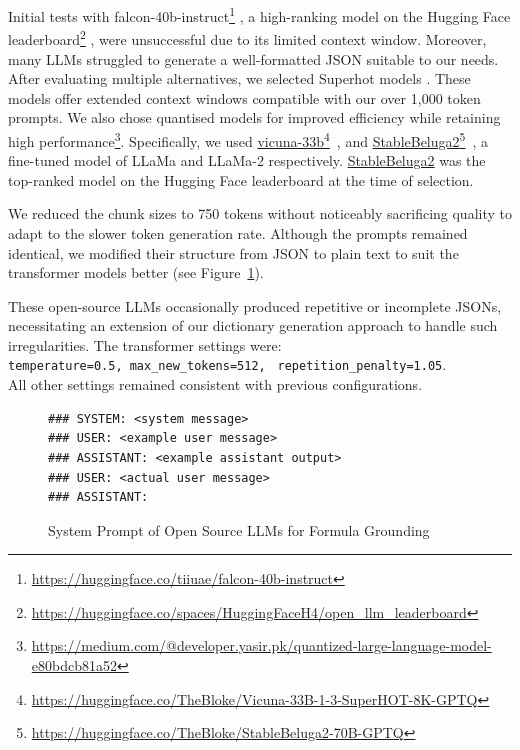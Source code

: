 Initial tests with falcon-40b-instruct\footnote{\url{https://huggingface.co/tiiuae/falcon-40b-instruct}} \citep{falcon40b, refinedweb, xu2023baize}, a high-ranking model on the Hugging Face leaderboard\footnote{\url{https://huggingface.co/spaces/HuggingFaceH4/open_llm_leaderboard}} \citep{jain2022hugging}, were unsuccessful due to its limited context window. Moreover, many LLMs struggled to generate a well-formatted JSON suitable to our needs. After evaluating multiple alternatives, we selected Superhot models \citep{chen2023extending}. These models offer extended context windows compatible with our over 1,000 token prompts. We also chose quantised models for improved efficiency while retaining high performance\footnote{\url{https://medium.com/@developer.yasir.pk/quantized-large-language-model-e80bdcb81a52}}. Specifically, we used \href{https://huggingface.co/TheBloke/Vicuna-33B-1-3-SuperHOT-8K-GPTQ}{vicuna-33b}\footnote{\url{https://huggingface.co/TheBloke/Vicuna-33B-1-3-SuperHOT-8K-GPTQ}}~\citep{zheng2023judging}, and \href{https://huggingface.co/TheBloke/StableBeluga2-70B-GPTQ}{StableBeluga2}\footnote{\url{https://huggingface.co/TheBloke/StableBeluga2-70B-GPTQ}}~\citep{StableBelugaModels, touvron2023llama, mukherjee2023orca}, a fine-tuned model of LLaMa and LLaMa-2 respectively. \href{https://huggingface.co/TheBloke/StableBeluga2-70B-GPTQ}{StableBeluga2} was the top-ranked model on the Hugging Face leaderboard at the time of selection.

We reduced the chunk sizes to 750 tokens without noticeably sacrificing quality to adapt to the slower token generation rate. Although the prompts remained identical, we modified their structure from JSON to plain text to suit the transformer models better (see Figure~\ref{fig:open-source-prompt-structure}). 

These open-source LLMs occasionally produced repetitive or incomplete JSONs, necessitating an extension of our dictionary generation approach to handle such irregularities. The transformer settings were:\\
\texttt{temperature=0.5, max\_new\_tokens=512,} \texttt{ repetition\_penalty=1.05}.\\
All other settings remained consistent with previous configurations.

\begin{figure}[htpb]
  \centering
  \begin{lstlisting}
### SYSTEM: <system message>
### USER: <example user message>
### ASSISTANT: <example assistant output>
### USER: <actual user message>
### ASSISTANT:
  \end{lstlisting}
  \caption[System Prompt for Annotation]{System Prompt of Open Source LLMs for Formula Grounding}\label{fig:open-source-prompt-structure}
\end{figure}

